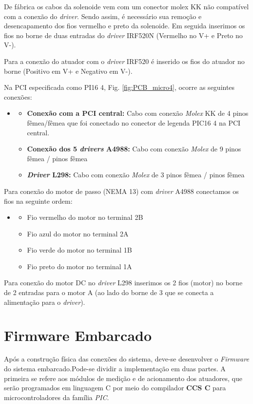 De fábrica os cabos da solenoide vem com um conector molex KK não compatível com a conexão do \textit{driver}. Sendo assim, é necessário sua remoção e desencapamento dos fios vermelho e preto da solenoide. Em seguida inserimos os fios no borne de duas entradas do \textit{driver} IRF520N (Vermelho no V+ e Preto no V-).

Para a conexão do atuador com o \textit{driver} IRF520 é inserido os fios do atuador no borne (Positivo em V+ e Negativo em V-).


Na PCI especificada como PI16 4, Fig. \ref{fig:PCB_micro4}, ocorre as seguintes conexões:

\begin{itemize}
    \item[]
    \begin{itemize}
    \item \textbf{Conexão com a PCI central:} Cabo com conexão \textit{Molex} KK de 4 pinos fêmea/fêmea que foi conectado no conector de legenda PIC16 4 na PCI central.
    \item \textbf{Conexão dos 5 \textit{drivers} A4988:} Cabo com conexão \textit{Molex} de 9 pinos fêmea / pinos fêmea 
    \item \textbf{\textit{Driver} L298:} Cabo com conexão \textit{Molex} de 3 pinos fêmea / pinos fêmea
\end{itemize}
\end{itemize}

Para conexão do motor de passo (NEMA 13) com \textit{driver} A4988 conectamos os fios na seguinte ordem:

\begin{itemize}
    \item[]
    \begin{itemize}
        \item Fio vermelho do motor no terminal 2B
        \item Fio azul do motor no terminal 2A
        \item Fio verde do motor no terminal 1B
        \item Fio preto do motor no terminal 1A
    \end{itemize}
\end{itemize}

Para conexão do motor DC no \textit{driver} L298 inserimos os 2 fios (motor) no borne de 2 entradas para o motor A (ao lado do borne de 3 que se conecta a alimentação para o \textit{driver}).


\section{Firmware Embarcado}%
Após a construção física das conexões do sistema, deve-se desenvolver o \textit{Firmware} do sistema embarcado.Pode-se dividir a implementação em duas partes. A primeira se refere aos módulos de medição e de acionamento dos atuadores, que serão programados em linguagem C por meio do compilador \textbf{CCS C} para microcontroladores da família \textit{PIC}.

